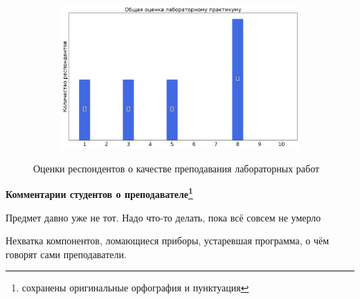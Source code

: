 \begin{figure}[H]
\begin{subfigure}[b]{0.45\textwidth}
			\end{subfigure}
			\begin{subfigure}[b]{0.45\textwidth}
				\centering
				\includegraphics[width=\textwidth]{images/3 course/Аналоговая электроника/labniks-marks-Арумов Г.П.-3.png}
			\end{subfigure}	
			\caption{Оценки респондентов о качестве преподавания лабораторных работ}
		\end{figure}

		\textbf{Комментарии студентов о преподавателе\protect\footnote{сохранены оригинальные орфография и пунктуация}}
            \begin{commentbox} 
                Предмет давно уже не тот. Надо что-то делать, пока всё совсем не умерло 
            \end{commentbox} 
        
            \begin{commentbox} 
                Нехватка компонентов, ломающиеся приборы, устаревшая программа, о чём говорят сами преподаватели.  
            \end{commentbox} 



